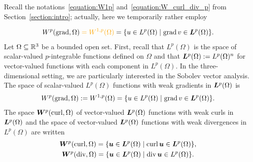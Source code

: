 \documentclass[10pt,letterpaper]{article}
\newcommand\cye[1]{%
\protect\leavevmode
\begingroup
    \color{red!35!yellow}%
    #1%
\endgroup
}
\newcommand{\mwl}[1]{{\color{red}#1}}
\begin{document}
\cye{Recall the notations~\eqref{equation:W1p} and~\eqref{equation:W_curl_div_p} from Section~\ref{section:intro}; actually, here we temporarily rather employ }
\begin{gather*}
    W^{p}(\grad,\Omega) \cye{= W^{1,p}(\Omega)} = \{ u \in L^{p}(\Omega) \suchthat \grad v \in \bfL^{p}(\Omega) \}
    .
\end{gather*}
\mwl{Let $\Omega \subseteq {\mathbb R}^{3}$ be a bounded open set. 
First, recall that $L^{p}(\Omega)$ is the space of scalar-valued $p$-integrable functions defined on $\Omega$
and that $\bm{L}^{p}(\Omega) := L^{p}(\Omega)^{n}$ for vector-valued functions with each component in $L^{p}(\Omega)$. 
In the three-dimensional setting, we are particularly interested in the Sobolev vector analysis. 
The space of scalar-valued $L^{p}(\Omega)$ functions with weak gradients in $\bm{L}^{p}(\Omega)$ is 
\begin{gather*}
    W^{p}(\grad,\Omega) := W^{1,p}(\Omega) = \{ u \in L^{p}(\Omega) \suchthat \grad v \in \bfL^{p}(\Omega) \}
    .
\end{gather*}
The space $\bm{W}^{p}(\operatorname{curl},\Omega)$ of vector-valued $\bm{L}^{p}(\Omega)$ functions with weak curls in $\bm{L}^{p}(\Omega)$
and the space of vector-valued $\bm{L}^{p}(\Omega)$ functions with weak divergences in $L^{p}(\Omega)$ are written 
\begin{gather*}
    \bfW^{p}(\curl,\Omega) = \{ \bfu \in \bfL^{p}(\Omega) \suchthat \curl \bfu \in \bfL^{p}(\Omega) \},
    \\ 
    \bfW^{p}(\divergence,\Omega) = \{ \bfu \in \bfL^{p}(\Omega) \suchthat \divergence \bfu \in L^{p}(\Omega) \}.
\end{gather*}}
\end{document}
